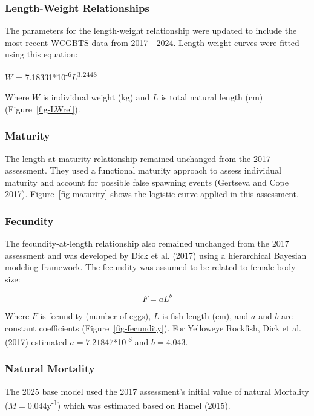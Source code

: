 \documentclass[
  english,
]{article}
\begin{document}
\subsubsection{Length-Weight
Relationships}\label{length-weight-relationships}

The parameters for the length-weight relationship were updated to
include the most recent WCGBTS data from 2017 - 2024. Length-weight
curves were fitted using this equation:

\(W\) = 7.18331*10\textsuperscript{-6}\(L\)\textsuperscript{3.2448}

Where \(W\) is individual weight (kg) and \(L\) is total natural length
(cm) (Figure~\ref{fig-LWrel}).

\subsubsection{Maturity}\label{maturity}

The length at maturity relationship remained unchanged from the 2017
assessment. They used a functional maturity approach to assess
individual maturity and account for possible false spawning events
(Gertseva and Cope 2017). Figure~\ref{fig-maturity} shows the logistic
curve applied in this assessment.

\subsubsection{Fecundity}\label{fecundity}

The fecundity-at-length relationship also remained unchanged from the
2017 assessment and was developed by Dick et al. (2017) using a
hierarchical Bayesian modeling framework. The fecundity was assumed to
be related to female body size:

\[
F = aL^b
\]

Where \(F\) is fecundity (number of eggs), \(L\) is fish length (cm),
and \(a\) and \(b\) are constant coefficients
(Figure~\ref{fig-fecundity}). For Yelloweye Rockfish, Dick et al. (2017)
estimated \(a = 7.21847\)*10\textsuperscript{-8} and \(b = 4.043\).

\subsubsection{Natural Mortality}\label{natural-mortality}

The 2025 base model used the 2017 assessment's initial value of natural
Mortality (\(M = 0.044\)y\textsuperscript{-1}) which was estimated based
on Hamel (2015).
\end{document}
